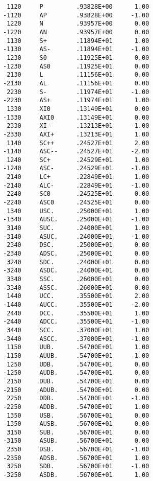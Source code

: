 \begin{verbatim}
       1120     P         .93828E+00      1.00
      -1120     AP        .93828E+00     -1.00
       1220     N         .93957E+00      0.00
      -1220     AN        .93957E+00      0.00
       1130     S+        .11894E+01      1.00
      -1130     AS-       .11894E+01     -1.00
       1230     S0        .11925E+01      0.00
      -1230     AS0       .11925E+01      0.00
       2130     L         .11156E+01      0.00
      -2130     AL        .11156E+01      0.00
       2230     S-        .11974E+01     -1.00
      -2230     AS+       .11974E+01      1.00
       1330     XI0       .13149E+01      0.00
      -1330     AXI0      .13149E+01      0.00
       2330     XI-       .13213E+01     -1.00
      -2330     AXI+      .13213E+01      1.00
       1140     SC++      .24527E+01      2.00
      -1140     ASC--     .24527E+01     -2.00
       1240     SC+       .24529E+01      1.00
      -1240     ASC-      .24529E+01     -1.00
       2140     LC+       .22849E+01      1.00
      -2140     ALC-      .22849E+01     -1.00
       2240     SC0       .24525E+01      0.00
      -2240     ASC0      .24525E+01      0.00
       1340     USC.      .25000E+01      1.00
      -1340     AUSC.     .25000E+01     -1.00
       3140     SUC.      .24000E+01      1.00
      -3140     ASUC.     .24000E+01     -1.00
       2340     DSC.      .25000E+01      0.00
      -2340     ADSC.     .25000E+01      0.00
       3240     SDC.      .24000E+01      0.00
      -3240     ASDC.     .24000E+01      0.00
       3340     SSC.      .26000E+01      0.00
      -3340     ASSC.     .26000E+01      0.00
       1440     UCC.      .35500E+01      2.00
      -1440     AUCC.     .35500E+01     -2.00
       2440     DCC.      .35500E+01      1.00
      -2440     ADCC.     .35500E+01     -1.00
       3440     SCC.      .37000E+01      1.00
      -3440     ASCC.     .37000E+01     -1.00
       1150     UUB.      .54700E+01      1.00
      -1150     AUUB.     .54700E+01     -1.00
       1250     UDB.      .54700E+01      0.00
      -1250     AUDB.     .54700E+01      0.00
       2150     DUB.      .54700E+01      0.00
      -2150     ADUB.     .54700E+01      0.00
       2250     DDB.      .54700E+01     -1.00
      -2250     ADDB.     .54700E+01      1.00
       1350     USB.      .56700E+01      0.00
      -1350     AUSB.     .56700E+01      0.00
       3150     SUB.      .56700E+01      0.00
      -3150     ASUB.     .56700E+01      0.00
       2350     DSB.      .56700E+01     -1.00
      -2350     ADSB.     .56700E+01      1.00
       3250     SDB.      .56700E+01     -1.00
      -3250     ASDB.     .56700E+01      1.00

\end{verbatim}
